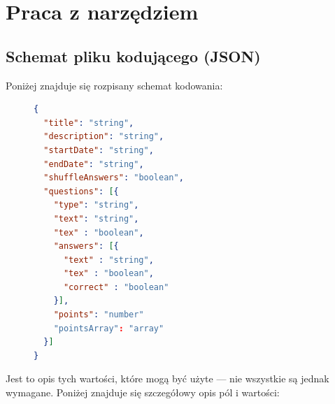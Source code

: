 \section{Praca z narzędziem}

\subsection{Schemat pliku kodującego (JSON)}
Poniżej znajduje się rozpisany schemat kodowania: 
\begin{figure}[H]
\begin{lstlisting}[language=json,firstnumber=1]
{
  "title": "string",
  "description": "string",
  "startDate": "string",
  "endDate": "string",
  "shuffleAnswers": "boolean",
  "questions": [{
    "type": "string", 
    "text": "string",
    "tex" : "boolean",
    "answers": [{
      "text" : "string",
      "tex" : "boolean",
      "correct" : "boolean"
    }],
    "points": "number"
    "pointsArray": "array"
  }]
}

\end{lstlisting}
\end{figure}
Jest to opis tych wartości, które mogą być użyte --- nie wszystkie są jednak 
wymagane. Poniżej znajduje się szczegółowy opis pól i wartości:
